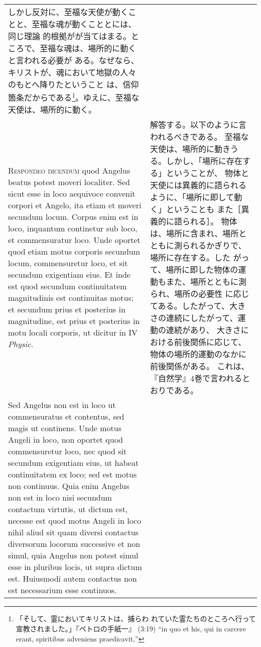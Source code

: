 \documentclass[10pt]{jsarticle} %
\begin{document}
\begin{longtable}{p{21em}p{21em}}
しかし反対に、至福な天使が動くことと、至福な魂が動くこととには、同じ理論
 的根拠がが当てはまる。ところで、至福な魂は、場所的に動くと言われる必要が
 ある。なぜなら、キリストが、魂において地獄の人々のもとへ降りたということ
 は、信仰箇条だからである\footnote{「そして、霊においてキリストは、捕らわ
 れていた霊たちのところへ行って宣教されました。」『ペトロの手紙一』
 (3:19) ``in quo et his, qui in carcere erant, spiritibus adveniens
 praedicavit,'' }。ゆえに、至福な天使は、場所的に動く。


\\


{\scshape Respondeo dicendum} quod Angelus beatus potest
moveri localiter. Sed sicut esse in loco aequivoce convenit corpori et
Angelo, ita etiam et moveri secundum locum. Corpus enim est in loco,
inquantum continetur sub loco, et commensuratur loco. Unde oportet quod
etiam motus corporis secundum locum, commensuretur loco, et sit secundum
exigentiam eius. Et inde est quod secundum continuitatem magnitudinis
est continuitas motus; et secundum prius et posterius in magnitudine,
est prius et posterius in motu locali corporis, ut dicitur in IV
{\itshape Physic}. 



&

解答する。以下のように言われるべきである。
至福な天使は、場所的に動きうる。しかし、「場所に存在する」ということが、
 物体と天使には異義的に語られるように、「場所に即して動く」ということも
 また［異義的に語られる］。
物体は、場所に含まれ、場所とともに測られるかぎりで、場所に存在する。した
 がって、場所に即した物体の運動もまた、場所とともに測られ、場所の必要性
 に応じてある。したがって、大きさの連続にしたがって、運動の連続があり、
 大きさにおける前後関係に応じて、物体の場所的運動のなかに前後関係がある。
 これは、『自然学』4巻で言われるとおりである。

\\


Sed Angelus non est in loco ut commensuratus et contentus, sed
magis ut continens. Unde motus Angeli in loco, non oportet quod
commensuretur loco, nec quod sit secundum exigentiam eius, ut habeat
continuitatem ex loco; sed est motus non continuus. Quia enim Angelus
non est in loco nisi secundum contactum virtutis, ut dictum est, necesse
est quod motus Angeli in loco nihil aliud sit quam diversi contactus
diversorum locorum successive et non simul, quia Angelus non potest
simul esse in pluribus locis, ut supra dictum est. Huiusmodi autem
contactus non est necessarium esse continuos. 



\end{longtable}
\end{document}
